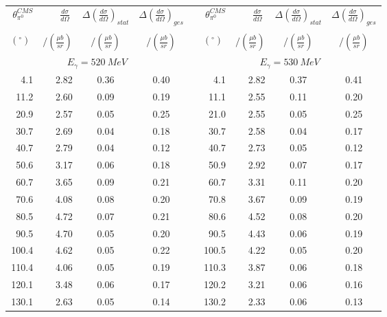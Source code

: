 \begin{table}[htbp] 
\begin{center} 
\begin{tabular}{|r|r|c|c|l|r|r|c|c|} 

\cline{1-4}
\cline{6-9} 
$\theta_{\pi^0}^{CMS}$ & 
$\displaystyle\frac{d\sigma}{d\Omega}\;$ & 
${\Delta}\left( \frac{d\sigma}{d\Omega}\right)_{stat}$ & 
${\Delta}\left( \frac{d\sigma}{d\Omega}\right)_{ges}$ & & 
$\theta_{\pi^0}^{CMS}$ & 
$\displaystyle\frac{d\sigma}{d\Omega}\;$ & 
${\Delta}\left( \frac{d\sigma}{d\Omega}\right)_{stat}$ & 
${\Delta}\left( \frac{d\sigma}{d\Omega}\right)_{ges}$ \\ 
& & & & & & & &\\ 
 $(^{\circ})\;$ & $/(\frac{{\mu}b}{sr})$ & $/(\frac{{\mu}b}{sr})$ & $/(\frac{{\mu}b}{sr})$ & & $(^{\circ})\;$ & $/(\frac{{\mu}b}{sr})$ & $/(\frac{{\mu}b}{sr})$ & $/(\frac{{\mu}b}{sr})$ \\ 
\cline{1-4} 
\cline{6-9} 
\multicolumn{4}{|c|}{ $E_{\gamma}=520~MeV$} & & 
\multicolumn{4}{c|}{ $E_{\gamma}=530~MeV$} \\ 
\cline{1-4} 
\cline{6-9} 
  4.1 &  2.82 &  0.36 &  0.40 & &   4.1 &  2.82 &  0.37 &  0.41 \\ 
 11.2 &  2.60 &  0.09 &  0.19 & &  11.1 &  2.55 &  0.11 &  0.20 \\ 
 20.9 &  2.57 &  0.05 &  0.25 & &  21.0 &  2.55 &  0.05 &  0.25 \\ 
 30.7 &  2.69 &  0.04 &  0.18 & &  30.7 &  2.58 &  0.04 &  0.17 \\ 
 40.7 &  2.79 &  0.04 &  0.12 & &  40.7 &  2.73 &  0.05 &  0.12 \\ 
 50.6 &  3.17 &  0.06 &  0.18 & &  50.9 &  2.92 &  0.07 &  0.17 \\ 
 60.7 &  3.65 &  0.09 &  0.21 & &  60.7 &  3.31 &  0.11 &  0.20 \\ 
 70.6 &  4.08 &  0.08 &  0.20 & &  70.8 &  3.67 &  0.09 &  0.19 \\ 
 80.5 &  4.72 &  0.07 &  0.21 & &  80.6 &  4.52 &  0.08 &  0.20 \\ 
 90.5 &  4.70 &  0.05 &  0.20 & &  90.5 &  4.43 &  0.06 &  0.19 \\ 
100.4 &  4.62 &  0.05 &  0.22 & & 100.5 &  4.22 &  0.05 &  0.20 \\ 
110.4 &  4.06 &  0.05 &  0.19 & & 110.3 &  3.87 &  0.06 &  0.18 \\ 
120.1 &  3.48 &  0.06 &  0.17 & & 120.2 &  3.21 &  0.06 &  0.16 \\ 
130.1 &  2.63 &  0.05 &  0.14 & & 130.2 &  2.33 &  0.06 &  0.13 \\ 

\end{tabular}
\end{center}
\end{table}
